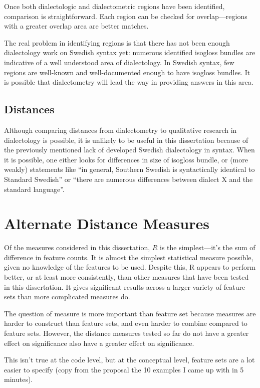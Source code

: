 Once both dialectologic and dialectometric regions have been
identified, comparison is straightforward. Each region can be checked
for overlap---regions with a greater overlap area are better matches.

The real problem in identifying regions is that there has not been
enough dialectology work on Swedish syntax yet: numerous identified
isogloss bundles are indicative of a well understood area of
dialectology. In Swedish syntax, few regions are well-known and
well-documented enough to have isogloss bundles. It is possible that
dialectometry will lead the way in providing answers in this
area.

\subsection{Distances}

Although comparing distances from dialectometry to qualitative
research in dialectology is possible, it is unlikely to be useful in
this dissertation because of the previously mentioned lack of
developed Swedish dialectology in syntax. When it is possible,
one either looks for differences in size of isogloss bundle, or (more
weakly) statements like ``in general, Southern
Swedish is syntactically identical to Standard Swedish''
\cite{rosenkvist07} or ``there are numerous differences between
dialect X and the standard language''.

\section{Alternate Distance Measures}

Of the measures considered in this dissertation, $R$ is the
simplest---it's the sum of difference in feature counts. It is almost
the simplest statistical measure possible, given no knowledge of the
features to be used. Despite this, R appears to perform better, or
at least more consistently, than other measures that have been tested
in this dissertation. It gives significant results across a larger
variety of feature sets than more complicated measures do.

The question of measure is more important than feature set because
measures are harder to construct than feature sets, and even harder to
combine compared to feature sets. However, the distance measures
tested so far do not have a greater effect on significance also have a
greater effect on significance.


This isn't
true at the code level, but at the conceptual level, feature
sets are a lot easier to specify (copy from the proposal the 10
examples I came up with in 5 minutes).


